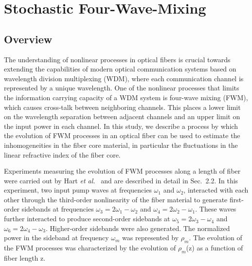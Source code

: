 
\renewcommand{\thechapter}{2}

\chapter{Stochastic Four-Wave-Mixing}

\section{Overview}

The understanding of nonlinear processes in optical fibers is crucial towards 
extending the capabilities of modern optical communication systems based on 
wavelength division multiplexing (WDM), where each communication channel is 
represented by a unique wavelength. One of the nonlinear processes that 
limits the information carrying capacity of a WDM system is four-wave mixing 
(FWM), which causes cross-talk between neighboring channels. This places a 
lower limit on the wavelength separation between adjacent channels and an
upper limit on the input power in each channel. In this study, we describe
a process by which the evolution of FWM processes in an optical fiber can be 
used to estimate the inhomogeneities in the fiber core material, in particular 
the fluctuations in the linear refractive index of the fiber core.  

Experiments measuring the evolution of FWM processes along a length of fiber 
were carried out by Hart {\it et al.}\ \cite{hart1} and are described in detail in 
Sec.\ 2.2. In this experiment, two input pump waves at frequencies
$\omega_1$ and $\omega_2$, interacted with each other through the third-order 
nonlinearity of the fiber material to generate first-order sidebands at frequencies 
$\omega_3 = 2\omega_1 - \omega_2$ and $\omega_4 = 2\omega_2 - \omega_1$. 
These waves further interacted to produce second-order sidebands at 
$\omega_5 = 2\omega_3 - \omega_4$ and $\omega_6 = 2\omega_4 - \omega_3$. 
Higher-order sidebands were also generated. The normalized power in the 
sideband at frequency $\omega_m$ was represented by $\rho_m$. The 
evolution of the FWM processes was characterized by the evolution of 
$\rho_m$(z) as a function of fiber length z. 

